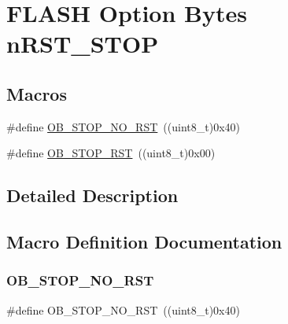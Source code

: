 \hypertarget{group___f_l_a_s_h_ex___option___bytes__n_r_s_t___s_t_o_p}{}\section{F\+L\+A\+SH Option Bytes n\+R\+S\+T\+\_\+\+S\+T\+OP}
\label{group___f_l_a_s_h_ex___option___bytes__n_r_s_t___s_t_o_p}
\subsection*{Macros}
\begin{DoxyCompactItemize}
\item 
\#define \hyperlink{group___f_l_a_s_h_ex___option___bytes__n_r_s_t___s_t_o_p_ga7344fe0ec25c5eb2d11db7c855325436}{O\+B\+\_\+\+S\+T\+O\+P\+\_\+\+N\+O\+\_\+\+R\+ST}~((uint8\+\_\+t)0x40)
\item 
\#define \hyperlink{group___f_l_a_s_h_ex___option___bytes__n_r_s_t___s_t_o_p_gaef92c03b1f279c532bfa13d3bb074b57}{O\+B\+\_\+\+S\+T\+O\+P\+\_\+\+R\+ST}~((uint8\+\_\+t)0x00)
\end{DoxyCompactItemize}


\subsection{Detailed Description}


\subsection{Macro Definition Documentation}
\mbox{\label{group___f_l_a_s_h_ex___option___bytes__n_r_s_t___s_t_o_p_ga7344fe0ec25c5eb2d11db7c855325436}} 
\subsubsection{\texorpdfstring{O\+B\+\_\+\+S\+T\+O\+P\+\_\+\+N\+O\+\_\+\+R\+ST}{OB\_STOP\_NO\_RST}}
{\footnotesize\ttfamily \#define O\+B\+\_\+\+S\+T\+O\+P\+\_\+\+N\+O\+\_\+\+R\+ST~((uint8\+\_\+t)0x40)}

